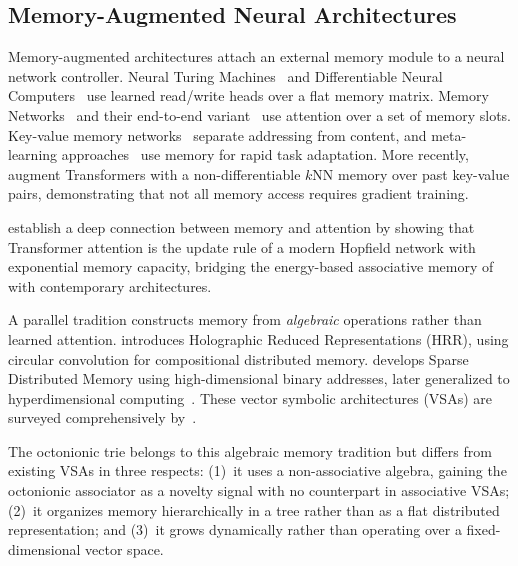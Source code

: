 \documentclass[11pt,a4paper]{article}
\theoremstyle{definition}
\theoremstyle{remark}
\begin{document}
\subsection{Memory-Augmented Neural Architectures}

Memory-augmented architectures attach an external memory module to a neural network controller. Neural Turing Machines~\citep{Graves2014} and Differentiable Neural Computers~\citep{Graves2016} use learned read/write heads over a flat memory matrix. Memory Networks~\citep{Weston2015} and their end-to-end variant~\citep{Sukhbaatar2015} use attention over a set of memory slots. Key-value memory networks~\citep{Miller2016} separate addressing from content, and meta-learning approaches~\citep{Santoro2016,Munkhdalai2017} use memory for rapid task adaptation. More recently, \citet{Wu2022} augment Transformers with a non-differentiable $k$NN memory over past key-value pairs, demonstrating that not all memory access requires gradient training.

\citet{Ramsauer2021} establish a deep connection between memory and attention by showing that Transformer attention is the update rule of a modern Hopfield network with exponential memory capacity, bridging the energy-based associative memory of~\citet{Hopfield1982} with contemporary architectures.

A parallel tradition constructs memory from \emph{algebraic} operations rather than learned attention. \citet{Plate1995} introduces Holographic Reduced Representations (HRR), using circular convolution for compositional distributed memory. \citet{Kanerva1988} develops Sparse Distributed Memory using high-dimensional binary addresses, later generalized to hyperdimensional computing~\citep{Kanerva2009}. These vector symbolic architectures (VSAs) are surveyed comprehensively by~\citet{Kleyko2023a,Kleyko2023b}.

The octonionic trie belongs to this algebraic memory tradition but differs from existing VSAs in three respects: (1)~it uses a non-associative algebra, gaining the octonionic associator as a novelty signal with no counterpart in associative VSAs; (2)~it organizes memory hierarchically in a tree rather than as a flat distributed representation; and (3)~it grows dynamically rather than operating over a fixed-dimensional vector space.
\end{document}
